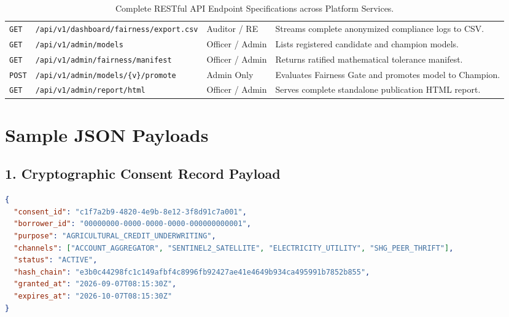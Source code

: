 \documentclass[11pt,a4paper,oneside]{report}
\begin{document}
\begin{table}[H]
\begin{tabularx}{\textwidth}{l p{5.0cm} p{2.2cm} X}
  \texttt{GET} & \texttt{/api/v1/dashboard/fairness/export.csv} & Auditor / RE & Streams complete anonymized compliance logs to CSV. \\
  \addlinespace
  \texttt{GET} & \texttt{/api/v1/admin/models} & Officer / Admin & Lists registered candidate and champion models. \\
  \texttt{GET} & \texttt{/api/v1/admin/fairness/manifest} & Officer / Admin & Returns ratified mathematical tolerance manifest. \\
  \texttt{POST} & \texttt{/api/v1/admin/models/\{v\}/promote} & Admin Only & Evaluates Fairness Gate and promotes model to Champion. \\
  \texttt{GET} & \texttt{/api/v1/admin/report/html} & Officer / Admin & Serves complete standalone publication HTML report. \\
  \bottomrule
\end{tabularx}
\caption{Complete RESTful API Endpoint Specifications across Platform Services.}
\label{tab:api_catalog}
\end{table}

\section{Sample JSON Payloads}

\subsection{1. Cryptographic Consent Record Payload}
\begin{lstlisting}[language=json, caption={Sample Cryptographic Consent Record JSON Payload.}]
{
  "consent_id": "c1f7a2b9-4820-4e9b-8e12-3f8d91c7a001",
  "borrower_id": "00000000-0000-0000-0000-000000000001",
  "purpose": "AGRICULTURAL_CREDIT_UNDERWRITING",
  "channels": ["ACCOUNT_AGGREGATOR", "SENTINEL2_SATELLITE", "ELECTRICITY_UTILITY", "SHG_PEER_THRIFT"],
  "status": "ACTIVE",
  "hash_chain": "e3b0c44298fc1c149afbf4c8996fb92427ae41e4649b934ca495991b7852b855",
  "granted_at": "2026-09-07T08:15:30Z",
  "expires_at": "2026-10-07T08:15:30Z"
}
\end{lstlisting}
\end{document}
